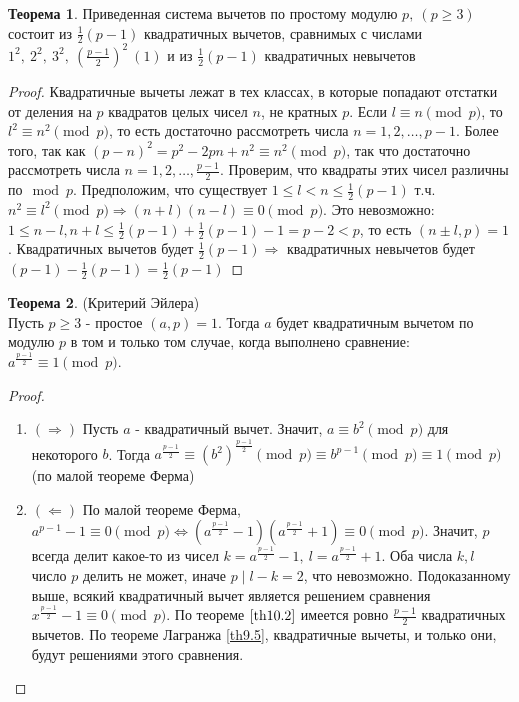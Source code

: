 \documentclass[a4paper, 12pt]{article}
\renewcommand{\div}{\mid}
\newcommand\tab[1][.5cm]{\hspace*{#1}}
\theoremstyle{definition}
\newtheorem{theorem}{Теорема}[section]
\begin{document}
    \begin{theorem} \label{th10.2}
        Приведенная система вычетов по простому модулю $p,\ (p\geq 3)$ состоит из $\frac{1}{2}(p-1)$ квадратичных вычетов, сравнимых с числами\\
        $1^2,\ 2^2,\ 3^2,\ (\frac{p-1}{2})^2\ (1)$ и из $\frac{1}{2}(p-1)$ квадратичных невычетов
    \end{theorem} 
    \begin{proof}
        Квадратичные вычеты лежат в тех классах, в которые попадают отстатки от деления на $p$ квадратов целых чисел $n$, не кратных $p$. Если $l\equiv n\pmod{p}$, то $l^2\equiv n^2\pmod{p}$, то есть достаточно рассмотреть числа $n=1,2,\dots,p-1$. Более того, так как $(p-n)^2=p^2-2pn+n^2\equiv n^2\pmod{p}$, так что достаточно рассмотреть числа $n=1,2,\dots,\frac{p-1}{2}$. Проверим, что квадраты этих чисел различны по$\mod{p}$. Предположим, что существует $1\leq l<n\leq\frac{1}{2}(p-1)$ т.ч. $n^2\equiv l^2\pmod{p} \Rightarrow (n+l)(n-l)\equiv 0\pmod{p}$. Это невозможно: $1\leq n-l, n+l\leq \frac{1}{2}(p-1)+\frac{1}{2}(p-1)-1=p-2<p$, то есть $(n\pm l, p)=1$. Квадратичных вычетов будет $\frac{1}{2}(p-1) \Rightarrow$ квадратичных невычетов будет $(p-1)-\frac{1}{2}(p-1)=\frac{1}{2}(p-1)$
    \end{proof} 
    \begin{theorem} (Критерий Эйлера) \label{th10.3}\\
        Пусть $p\geq 3$ - простое $(a,p)=1$. Тогда $a$ будет квадратичным вычетом по модулю $p$ в том и только том случае, когда выполнено сравнение:\\
        $a^{\frac{p-1}{2}}\equiv 1\pmod{p}$.
    \end{theorem} 
    \begin{proof}\tab
        \begin{enumerate}
            \item $(\Rightarrow)$ Пусть $a$ - квадратичный вычет. Значит, $a\equiv b^2\pmod{p}$ для некоторого $b$. Тогда $a^{\frac{p-1}{2}}\equiv (b^2)^{\frac{p-1}{2}}\pmod{p}\equiv b^{p-1}\pmod{p}\equiv 1 \pmod{p}$ (по малой теореме Ферма)
            \item $(\Leftarrow)$ По малой теореме Ферма, $a^{p-1}-1\equiv 0\pmod{p}\Leftrightarrow (a^{\frac{p-1}{2}}-1)(a^{\frac{p-1}{2}}+1)\equiv 0\pmod{p}$. Значит, $p$ всегда делит какое-то из чисел $k=a^{\frac{p-1}{2}}-1,\ l=a^{\frac{p-1}{2}}+1$. Оба числа $k,l$ число $p$ делить не может, иначе $p\div l-k=2$, что невозможно. Подоказанному выше, всякий квадратичный вычет является решением сравнения $x^{\frac{p-1}{2}}-1\equiv 0\pmod{p}$. По теореме $\ref{th10.2}$ имеется ровно $\frac{p-1}{2}$ квадратичных вычетов. По теореме Лагранжа \eqref{th9.5}, квадратичные вычеты, и только они, будут решениями этого сравнения.
        \end{enumerate}
    \end{proof} 
\end{document}
